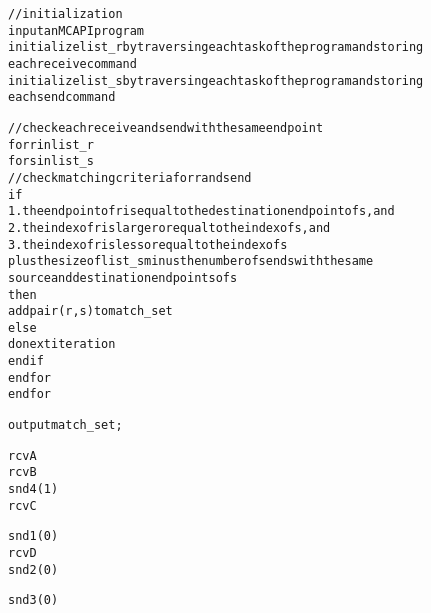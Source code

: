 
\newsavebox{\boxalgorithm}
\begin{lrbox}{\boxalgorithm}
\begin{minipage}[c]{1.4\linewidth}
\begin{alltt}
//initialization
input an MCAPI program
initialize list_r by traversing each task of the program and storing
each receive command
initialize list_s by traversing each task of the program and storing
each send command

//check each receive and send with the same endpoint
for r in list_r
  for s in list_s
    //check matching criteria for r and send
    if 
      1.the endpoint of r is equal to the destination endpoint of s, and
      2.the index of r is larger or equal to the index of s, and
      3.the index of r is less or equal to the index of s
        plus the size of list_s minus the number of sends with the same
        source and destination endpoints of s
    then 
      add pair (r, s) to match_set
    else
      do next iteration
    end if
  end for
end for

output match_set;
\end{alltt}
\end{minipage}
\end{lrbox}

\newsavebox{\boxtaskzero}
\begin{lrbox}{\boxtaskzero}
\begin{minipage}[t]{0.2\linewidth}
\begin{alltt}
rcvA
rcvB
snd4(1)
rcvC
\end{alltt}
\end{minipage}
\end{lrbox}

\newsavebox{\boxtaskone}
\begin{lrbox}{\boxtaskone}
\begin{minipage}[t]{0.2\linewidth}
\begin{alltt}
snd1(0)
rcvD
snd2(0)
\end{alltt}
\end{minipage}
\end{lrbox}

\newsavebox{\boxtasktwo}
\begin{lrbox}{\boxtasktwo}
\begin{minipage}[t]{0.2\linewidth}
\begin{alltt}
snd3(0)
\end{alltt}
\end{minipage}
\end{lrbox}

